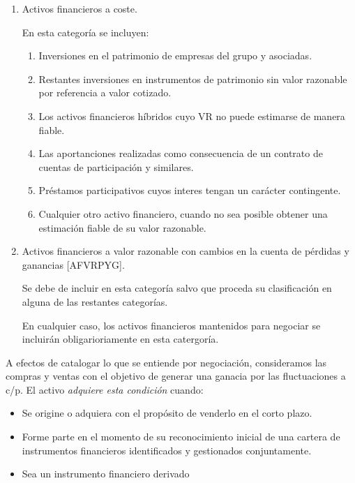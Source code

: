\begin{enumerate}
    \item Activos financieros a coste.
    
    En esta categoría se incluyen:

    \begin{enumerate}
        \item Inversiones en el patrimonio de empresas del grupo y asociadas.
        \item Restantes inversiones en instrumentos de patrimonio sin valor razonable por referencia a valor cotizado.
        \item Los activos financieros híbridos cuyo VR no puede estimarse de manera fiable.
        \item Las aportanciones realizadas como consecuencia de un contrato de cuentas de participación y similares.
        \item Préstamos participativos cuyos interes tengan un carácter contingente.
        \item Cualquier otro activo financiero, cuando no sea posible obtener una estimación fiable de su valor razonable.
    \end{enumerate}

    \item Activos financieros a valor razonable con cambios en la cuenta de pérdidas y ganancias [AFVRPYG].
    
    Se debe de incluir en esta categoría salvo que proceda su clasificación en alguna de las restantes categorías.

    En cualquier caso, los activos financieros mantenidos para negociar se incluirán obligarioriamente en esta catergoría.

\end{enumerate}

A efectos de catalogar lo que se entiende por negociación, consideramos las compras y ventas con el objetivo de generar una ganacia por las fluctuaciones a c/p. El activo \textit{adquiere esta condición} cuando:

\begin{itemize}
    \item Se origine o adquiera con el propósito de venderlo en el corto plazo.
    \item Forme parte en el momento de su reconocimiento inicial de una cartera de instrumentos financieros identificados y gestionados conjuntamente.
    \item Sea un instrumento financiero derivado
\end{itemize}

